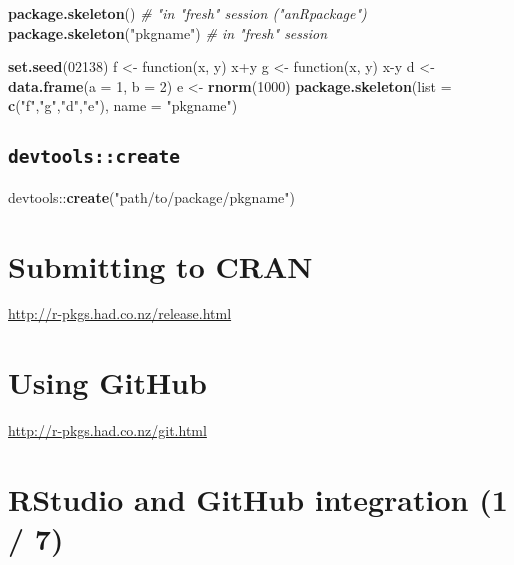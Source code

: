 \documentclass[]{book}
\newenvironment{Shaded}{\begin{snugshade}}{\end{snugshade}}
\newcommand{\KeywordTok}[1]{\textcolor[rgb]{0.13,0.29,0.53}{\textbf{{#1}}}}
\newcommand{\DataTypeTok}[1]{\textcolor[rgb]{0.13,0.29,0.53}{{#1}}}
\newcommand{\DecValTok}[1]{\textcolor[rgb]{0.00,0.00,0.81}{{#1}}}
\newcommand{\StringTok}[1]{\textcolor[rgb]{0.31,0.60,0.02}{{#1}}}
\newcommand{\CommentTok}[1]{\textcolor[rgb]{0.56,0.35,0.01}{\textit{{#1}}}}
\newcommand{\NormalTok}[1]{{#1}}
\theoremstyle{definition}
\theoremstyle{definition}
\theoremstyle{definition}
\theoremstyle{remark}
\begin{document}
\begin{Shaded}
\begin{Highlighting}[]
\KeywordTok{package.skeleton}\NormalTok{() }\CommentTok{# "in "fresh" session ("anRpackage")}
\KeywordTok{package.skeleton}\NormalTok{(}\StringTok{"pkgname"}\NormalTok{) }\CommentTok{# in "fresh" session}

\KeywordTok{set.seed}\NormalTok{(}\DecValTok{02138}\NormalTok{)}
\NormalTok{f <-}\StringTok{ }\NormalTok{function(x, y) x+y}
\NormalTok{g <-}\StringTok{ }\NormalTok{function(x, y) x-y}
\NormalTok{d <-}\StringTok{ }\KeywordTok{data.frame}\NormalTok{(}\DataTypeTok{a =} \DecValTok{1}\NormalTok{, }\DataTypeTok{b =} \DecValTok{2}\NormalTok{)}
\NormalTok{e <-}\StringTok{ }\KeywordTok{rnorm}\NormalTok{(}\DecValTok{1000}\NormalTok{)}
\KeywordTok{package.skeleton}\NormalTok{(}\DataTypeTok{list =} \KeywordTok{c}\NormalTok{(}\StringTok{"f"}\NormalTok{,}\StringTok{"g"}\NormalTok{,}\StringTok{"d"}\NormalTok{,}\StringTok{"e"}\NormalTok{), }\DataTypeTok{name =} \StringTok{"pkgname"}\NormalTok{)}
\end{Highlighting}
\end{Shaded}

\subsection{\texorpdfstring{\texttt{devtools::create}}{devtools::create}}\label{devtoolscreate}

\begin{Shaded}
\begin{Highlighting}[]
\NormalTok{devtools::}\KeywordTok{create}\NormalTok{(}\StringTok{"path/to/package/pkgname"}\NormalTok{)}
\end{Highlighting}
\end{Shaded}

\section{Submitting to CRAN}\label{submitting-to-cran}

\url{http://r-pkgs.had.co.nz/release.html}

\section{Using GitHub}\label{using-github}

\url{http://r-pkgs.had.co.nz/git.html}

\section{RStudio and GitHub integration (1 /
7)}\label{rstudio-and-github-integration-1-7}
\end{document}
